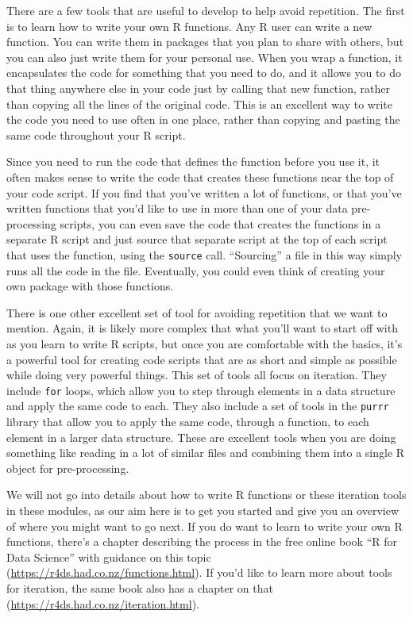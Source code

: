 \documentclass[]{tufte-book}
\begin{document}
There are a few tools that are useful to develop to help avoid repetition. The
first is to learn how to write your own R functions. Any R user can write a new
function. You can write them in packages that you plan to share with others, but
you can also just write them for your personal use. When you wrap a function, it
encapsulates the code for something that you need to do, and it allows you to do
that thing anywhere else in your code just by calling that new function, rather
than copying all the lines of the original code. This is an excellent way to
write the code you need to use often in one place, rather than copying and
pasting the same code throughout your R script.

Since you need to run the code that defines the function before you use it, it
often makes sense to write the code that creates these functions near the top of
your code script. If you find that you've written a lot of functions, or that
you've written functions that you'd like to use in more than one of your data
pre-processing scripts, you can even save the code that creates the functions in
a separate R script and just source that separate script at the top of each
script that uses the function, using the \texttt{source} call. ``Sourcing'' a file in
this way simply runs all the code in the file. Eventually, you could
even think of creating your own package with those functions.

There is one other excellent set of tool for avoiding repetition that we want to
mention. Again, it is likely more complex that what you'll want to start off
with as you learn to write R scripts, but once you are comfortable with the
basics, it's a powerful tool for creating code scripts that are as short and
simple as possible while doing very powerful things. This set of tools all focus
on iteration. They include \texttt{for} loops, which allow you to step through elements
in a data structure and apply the same code to each. They also include a set of
tools in the \texttt{purrr} library that allow you to apply the same code, through a
function, to each element in a larger data structure. These are excellent tools
when you are doing something like reading in a lot of similar files and
combining them into a single R object for pre-processing.

We will not go into details about how to write R functions or these iteration
tools in these modules, as our aim here is to get you started and give you an
overview of where you might want to go next. If you do want to learn to write
your own R functions, there's a chapter describing the process in the free
online book ``R for Data Science'' with guidance on this topic
(\url{https://r4ds.had.co.nz/functions.html}). If you'd like to learn more about tools
for iteration, the same book also has a chapter on that
(\url{https://r4ds.had.co.nz/iteration.html}).
\end{document}
